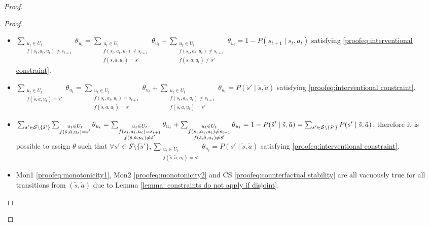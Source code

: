 \begin{proof}
\begin{proof}
\begin{itemize}
    \item $\sum_{\substack{u_t \in U_t\\f(s_t, a_t, u_t) \neq s_{t+1}}}{\theta_{u_t}} = \sum_{\substack{u_t \in U_t \\f(s_t, a_t, u_t) \neq s_{t+1} \\ f(\tilde{s}, \tilde{a}, u_t) = \tilde{s}'}} \theta_{u_t} + \sum_{\substack{u_t \in U_t \\f(s_t, a_t, u_t) \neq s_{t+1} \\ f(\tilde{s}, \tilde{a}, u_t) \neq \tilde{s}'}} \theta_{u_t} =1 -
    P(s_{t+1} \mid s_t, a_t)$ satisfying \eqref{proofeq:interventional constraint}.
    
    \item $\sum_{\substack{u_t \in U_t \\f(\tilde{s}, \tilde{a}, u_t) = \tilde{s}'}} \theta_{u_t} = \sum_{\substack{u_t \in U_t \\f(s_t, a_t, u_t) = s_{t+1} \\ f(\tilde{s}, \tilde{a}, u_t) = \tilde{s}'}} \theta_{u_t} + \sum_{\substack{u_t \in U_t \\f(s_t, a_t, u_t) \neq s_{t+1} \\ f(\tilde{s}, \tilde{a}, u_t) = \tilde{s}'}} \theta_{u_t} = P(\tilde{s}' \mid \tilde{s}, \tilde{a})$ satisfying \eqref{proofeq:interventional constraint}.
    
    \item $\sum_{s' \in \mathcal{S}\setminus\{\tilde{s}'\}}\sum_{\substack{u_t \in U_t \\f(\tilde{s}, \tilde{a}, u_t) = s'}} \theta_{u_t} = \sum_{\substack{u_t \in U_t \\f(s_t, a_t, u_t) = s_{t+1} \\ f(\tilde{s}, \tilde{a}, u_t) \neq \tilde{s}'}} \theta_{u_t} + \sum_{\substack{u_t \in U_t \\f(s_t, a_t, u_t) \neq s_{t+1} \\ f(\tilde{s}, \tilde{a}, u_t) \neq \tilde{s}'}} \theta_{u_t} \\= 1 - P(\tilde{s}' \mid \tilde{s}, \tilde{a}) = \sum_{s' \in \mathcal{S}\setminus\{\tilde{s}'\}}P(s' \mid \tilde{s}, \tilde{a})$, therefore it is possible to assign $\theta$ such that $\forall s' \in \mathcal{S}\setminus\{\tilde{s}'\}, \sum_{\substack{u_t \in U_t \\ f(\tilde{s}, \tilde{a}, u_t) = s'}}{\theta_{u_t}} = P(s' \mid \tilde{s}, \tilde{a})$ satisfying \eqref{proofeq:interventional constraint}.
    
    \item Mon1 \eqref{proofeq:monotonicity1}, Mon2 \eqref{proofeq:monotonicity2} and CS \eqref{proofeq:counterfactual stability} are all vacuously true for all transitions from $(\tilde{s}, \tilde{a})$ due to Lemma \ref{lemma: constraints do not apply if disjoint}.


\end{itemize}
\end{proof}
\end{proof}

